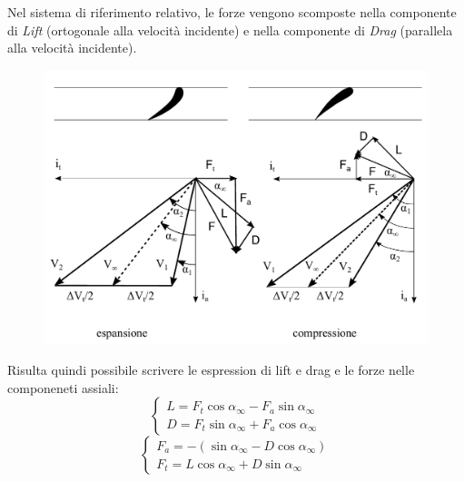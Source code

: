 Nel sistema di riferimento relativo, le forze vengono scomposte nella componente di \textit{Lift} (ortogonale alla velocità incidente) e nella componente di \textit{Drag} (parallela alla velocità incidente). 
\begin{figure}
\centering
  \includegraphics[width=.7\textwidth]{fig/triang1.pdf}
\caption{}
\label{fig:triang1}
\end{figure}
Risulta quindi possibile scrivere le espression di lift e drag e le forze nelle componeneti assiali:
\begin{equation}
	\begin{cases} 
		L = F_t \cos \alpha_{\infty} -  F_a \sin \alpha_{\infty}\\
		D = F_t \sin \alpha_{\infty} +  F_a \cos \alpha_{\infty}
	\end{cases}
\end{equation}
\begin{equation}
	\begin{cases} 
		F_a = - (\sin \alpha_{\infty} -  D \cos \alpha_{\infty})\\
		F_t = L \cos \alpha_{\infty} +  D \sin \alpha_{\infty}
	\end{cases}
\end{equation}

